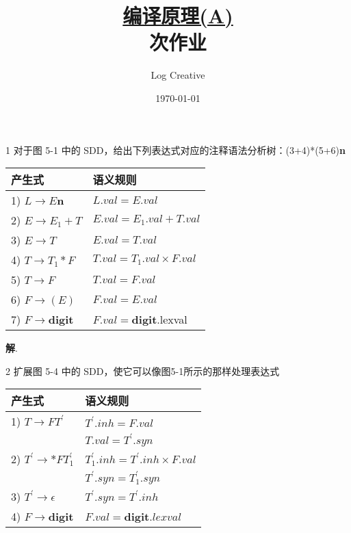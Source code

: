 \documentclass[12pt,a4paper]{article}
\newenvironment{problems}{\begin{list}{}{\renewcommand{\makelabel}[1]{\textbf{##1}\hfil}}}{\end{list}}
\providecommand{\sol}{\textbf{解}.~}
\begin{document}
\title{\normalsize \underline{编译原理(A)}\\ 次作业}
\author{Log Creative }
\date{\today}
\maketitle

\begin{problems}
    \item[1] 对于图 5-1 中的 SDD，给出下列表达式对应的注释语法分析树：(3+4)*(5+6)\textbf{n}
    
    \begin{table}[h]
        \centering
        \begin{tabular}{ll}
        \hline
        产生式 & 语义规则 \\
        \hline
        1) $L\rightarrow E$\textbf{n} & $L.val=E.val$\\
        2) $E\rightarrow E_1+T$ & $E.val=E_1.val+T.val$\\
        3) $E\rightarrow T$ & $E.val=T.val$\\
        4) $T\rightarrow T_1 * F$ & $T.val=T_1.val\times F.val$\\
        5) $T\rightarrow F$ & $T.val=F.val$\\
        6) $F\rightarrow (E)$ & $F.val=E.val$\\
        7) $F\rightarrow $\textbf{digit} & $F.val=$\textbf{digit}.lexval \\
        \hline
    \end{tabular}
    \end{table}

    \sol 
    \begin{figure}[H]
        \centering
        
    \end{figure}

    \item[2] 扩展图 5-4 中的 SDD，使它可以像图5-1所示的那样处理表达式
    \begin{table}[h]
        \centering
        \begin{tabular}{ll}
            \hline
            产生式 & 语义规则 \\
            \hline
            1) $T\rightarrow FT^\prime$ &
                $T^\prime .inh=F.val$\\
                & $T.val = T^\prime .syn$ \\
            2) $T^\prime \rightarrow *FT_1^\prime$ & $T_1^\prime .inh=T^\prime .inh\times F.val$\\
                & $T^\prime .syn=T_1^\prime .syn$\\
            3) $T^\prime \rightarrow \epsilon$ & $T^\prime .syn = T^\prime .inh$\\
            4) $F\rightarrow$\textbf{digit} & $F.val=$\textbf{digit}$.lexval$\\
            \hline
        \end{tabular} 
    \end{table}


\end{problems}
\end{document}
